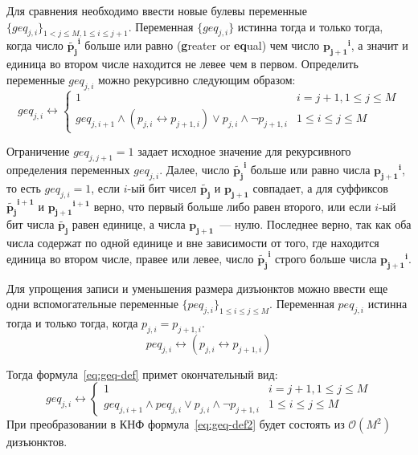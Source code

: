 Для сравнения необходимо ввести новые булевы переменные $\{\mathit{geq}_{j,i}\}_{1 < j \leq M, 1 \leq i \leq j + 1}$.
Переменная $\{\mathit{geq}_{j,i}\}$ истинна тогда и только тогда, когда число $\tilde{\mathbf{p_{j}}}^{\mathbf{i}}$ больше или равно (\textbf{g}reater or \textbf{eq}ual) чем число $\mathbf{p_{j + 1}}^{\mathbf{i}}$, а значит и единица во втором числе находится не левее чем в первом. 
Определить переменные $\mathit{geq}_{j,i}$ можно рекурсивно следующим образом:
%
\begin{equation}
\label{eq:geq-def}
  \mathit{geq}_{j,i} \leftrightarrow 
    \begin{cases} 
      1                               & i = j + 1, 1 \leq j \leq M \\
      \mathit{geq}_{j,i + 1} \wedge \left(p_{j,i} \leftrightarrow p_{j + 1, i}\right) \vee p_{j,i} \wedge \neg p_{j + 1, i}  & 1 \leq i \leq j \leq M
    \end{cases} 
\end{equation}

Ограничение $\mathit{geq}_{j,j + 1} = 1$ задает исходное значение для рекурсивного определения переменных $\mathit{geq}_{j,i}$.
Далее, число $\tilde{\mathbf{p_{j}}}^{\mathbf{i}}$ больше или равно числа $\mathbf{p_{j + 1}}^{\mathbf{i}}$, то есть $\mathit{geq}_{j,i} = 1$, если $i$-ый бит чисел $\tilde{\mathbf{p_{j}}}$ и $\mathbf{p_{j + 1}}$ совпадает, а для суффиксов $\tilde{\mathbf{p_{j}}}^{\mathbf{i + 1}}$ и $\mathbf{p_{j + 1}}^{\mathbf{i + 1}}$ верно, что первый больше либо равен второго, или если $i$-ый бит числа $\tilde{\mathbf{p_{j}}}$ равен единице, а числа $\mathbf{p_{j + 1}}$~{---} нулю.
Последнее верно, так как оба числа содержат по одной единице и вне зависимости от того, где находится единица во втором числе, правее или левее, число $\tilde{\mathbf{p_{j}}}^{\mathbf{i}}$ строго больше числа $\mathbf{p_{j + 1}}^{\mathbf{i}}$.

Для упрощения записи и уменьшения размера дизъюнктов можно ввести еще одни вспомогательные переменные $\{\mathit{peq}_{j,i}\}_{1 \leq i \leq j \leq M}$.
Переменная $\mathit{peq}_{j,i}$ истинна тогда и только тогда, когда $p_{j,i} = p_{j + 1,i}$.
%
\begin{equation}
\label{eq:peq-def}
  \mathit{peq}_{j,i} \leftrightarrow \left(p_{j,i} \leftrightarrow p_{j + 1, i}\right) 
\end{equation}


Тогда формула~\eqref{eq:geq-def} примет окончательный вид:
%
\begin{equation}
\label{eq:geq-def2}
  \mathit{geq}_{j,i} \leftrightarrow 
    \begin{cases} 
      1                               & i = j + 1, 1 \leq j \leq M \\
      \mathit{geq}_{j,i + 1} \wedge \mathit{peq}_{j,i} \vee p_{j,i} \wedge \neg p_{j + 1, i}  & 1 \leq i \leq j \leq M
    \end{cases} 
\end{equation}
%
При преобразовании в КНФ формула~\eqref{eq:geq-def2} будет состоять из $\mathcal{O}\left(M^{2}\right)$ дизъюнктов.

